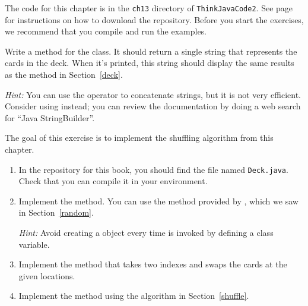 The code for this chapter is in the {\tt ch13} directory of {\tt ThinkJavaCode2}.
See page~\pageref{code} for instructions on how to download the repository.
Before you start the exercises, we recommend that you compile and run the examples.


\begin{exercise}  %

Write a  method for the  class.
It should return a single string that represents the cards in the deck.
When it's printed, this string should display the same results as the  method in Section~\ref{deck}.


{\it Hint:} You can use the \java{+} operator to concatenate strings, but it is not very efficient.
Consider using  instead; you can review the documentation by doing a web search for ``Java StringBuilder''.

\end{exercise}


\begin{exercise}  %
\label{ex.shuffle}

The goal of this exercise is to implement the shuffling algorithm from this chapter.

\begin{enumerate}

\item In the repository for this book, you should find the file named {\tt Deck.java}.
Check that you can compile it in your environment.

\item Implement the  method.
You can use the  method provided by , which we saw in Section~\ref{random}.

{\it Hint:} Avoid creating a  object every time  is invoked by defining a class variable.

\item Implement the  method that takes two indexes and swaps the cards at the given locations.

\item Implement the  method using the algorithm in Section~\ref{shuffle}.

\end{enumerate}

\end{exercise}


